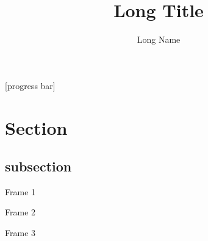 \documentclass[10pt]{beamer}
\begin{document}
[progress bar]


\title[Title]{Long Title}


\author[Name]{Long Name}

\maketitle

\section{Section}
\subsection{subsection}
\begin{frame}{Frame 1}

\end{frame}

\begin{frame}{Frame 2}

\end{frame}

\begin{frame}{Frame 3}

\end{frame}
\end{document}
